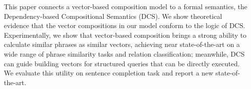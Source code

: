 This paper connects a vector-based composition model to a formal semantics, the Dependency-based Compositional Semantics (DCS). We show theoretical evidence that the vector compositions in our model conform to the logic of DCS. Experimentally, we show that vector-based composition brings a strong ability to calculate similar phrases as similar vectors, achieving near state-of-the-art on a wide range of phrase similarity tasks and relation classification; meanwhile, DCS can guide building vectors for structured queries that can be directly executed. We evaluate this utility on sentence completion task and report a new state-of-the-art.
